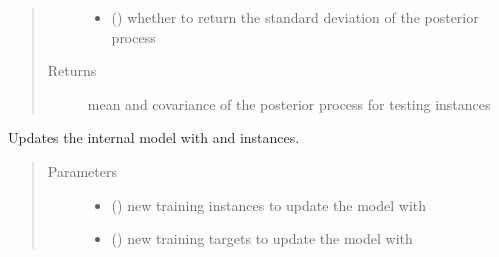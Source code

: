\documentclass[letterpaper,10pt,english]{sphinxmanual}
\begin{document}
\begin{fulllineitems}
\begin{fulllineitems}
\begin{quote}
\begin{description}
\begin{itemize}
\item {} 
 () \textendash{} whether to return the standard deviation of the posterior process

\end{itemize}

\item[{Returns}] \leavevmode
mean and covariance of the posterior process for testing instances

\end{description}\end{quote}

\end{fulllineitems}


\begin{fulllineitems}
\label{\detokenize{index:bo.surrogates.gaussian_process.GaussianProcess.update}}
Updates the internal model with  and  instances.
\begin{quote}\begin{description}
\item[{Parameters}] \leavevmode\begin{itemize}
\item {} 
 (\sphinxstyleliteralemphasis{, }\sphinxstyleliteralemphasis{(}\sphinxstyleliteralemphasis{(}\sphinxstyleliteralemphasis{, }\sphinxstyleliteralemphasis{)}\sphinxstyleliteralemphasis{)}) \textendash{} new training instances to update the model with

\item {} 
 (\sphinxstyleliteralemphasis{, }\sphinxstyleliteralemphasis{(}\sphinxstyleliteralemphasis{(}\sphinxstyleliteralemphasis{,}\sphinxstyleliteralemphasis{)}\sphinxstyleliteralemphasis{)}) \textendash{} new training targets to update the model with

\end{itemize}

\end{description}\end{quote}

\end{fulllineitems}


\end{fulllineitems}
\end{document}
